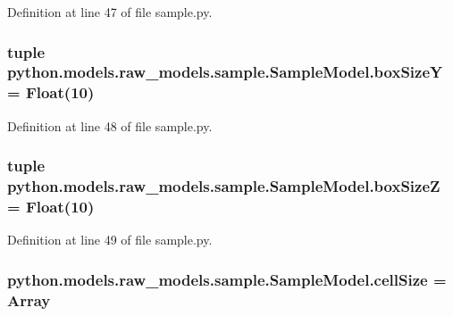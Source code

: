 Definition at line 47 of file sample.\-py.

\hypertarget{classpython_1_1models_1_1raw__models_1_1sample_1_1_sample_model_a792c794d433db1277fe5274a2761726b}{
\subsubsection[{box\-Size\-Y}]{\setlength{\rightskip}{0pt plus 5cm}tuple python.\-models.\-raw\-\_\-models.\-sample.\-Sample\-Model.\-box\-Size\-Y = Float(10)\hspace{0.3cm}{\ttfamily [static]}}}\label{classpython_1_1models_1_1raw__models_1_1sample_1_1_sample_model_a792c794d433db1277fe5274a2761726b}


Definition at line 48 of file sample.\-py.

\hypertarget{classpython_1_1models_1_1raw__models_1_1sample_1_1_sample_model_ad1e82c5d858664a52a89163893163658}{
\subsubsection[{box\-Size\-Z}]{\setlength{\rightskip}{0pt plus 5cm}tuple python.\-models.\-raw\-\_\-models.\-sample.\-Sample\-Model.\-box\-Size\-Z = Float(10)\hspace{0.3cm}{\ttfamily [static]}}}\label{classpython_1_1models_1_1raw__models_1_1sample_1_1_sample_model_ad1e82c5d858664a52a89163893163658}


Definition at line 49 of file sample.\-py.

\hypertarget{classpython_1_1models_1_1raw__models_1_1sample_1_1_sample_model_ad1dc27dc3554e58e58f96abef1627de2}{
\subsubsection[{cell\-Size}]{\setlength{\rightskip}{0pt plus 5cm}python.\-models.\-raw\-\_\-models.\-sample.\-Sample\-Model.\-cell\-Size = Array\hspace{0.3cm}{\ttfamily [static]}}}\label{classpython_1_1models_1_1raw__models_1_1sample_1_1_sample_model_ad1dc27dc3554e58e58f96abef1627de2}



